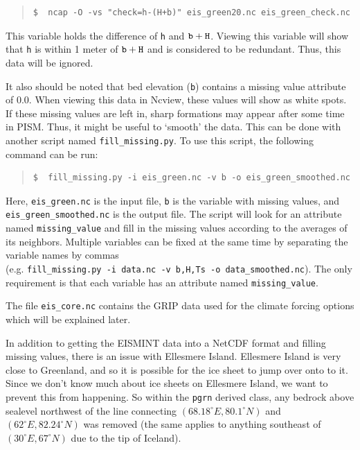 \documentclass[11pt,final]{amsart}
\begin{document}
\small\begin{quote}\begin{verbatim}
$  ncap -O -vs "check=h-(H+b)" eis_green20.nc eis_green_check.nc
\end{verbatim}
\end{quote}\normalsize

\noindent This variable holds the difference of \verb|h| and $\verb|b|+\verb|H|$.  Viewing this variable will show that \verb|h| is within 1 meter of $\verb|b|+\verb|H|$ and is considered to be redundant.  Thus, this data will be ignored.

It also should be noted that bed elevation (\verb|b|) contains a missing value attribute of $0.0$. When viewing this data in Ncview, these values will show as white spots. If these missing values are left in, sharp formations may appear after some time in PISM. Thus, it might be useful to `smooth' the data. This can be done with another script named \verb|fill_missing.py|. To use this script, the following command can be run:

\small\begin{quote}\begin{verbatim}
$  fill_missing.py -i eis_green.nc -v b -o eis_green_smoothed.nc
\end{verbatim}
\end{quote}\normalsize

\noindent Here, \verb|eis_green.nc| is the input file, \verb|b| is the variable with missing values, and \verb|eis_green_smoothed.nc| is the output file. The script will look for an attribute named \verb|missing_value| and fill in the missing values according to the averages of its neighbors. Multiple variables can be fixed at the same time by separating the variable names by commas \\
(e.g. \verb|fill_missing.py -i data.nc -v b,H,Ts -o data_smoothed.nc|). The only requirement is that each variable has an attribute named \verb|missing_value|.

The file \verb|eis_core.nc| contains the GRIP data used for the climate forcing options which will be explained later.

In addition to getting the EISMINT data into a NetCDF format and filling missing values, there is an issue with Ellesmere Island. Ellesmere Island is very close to Greenland, and so it is possible for the ice sheet to jump over onto to it. Since we don't know much about ice sheets on Ellesmere Island, we want to prevent this from happening. So within the \verb|pgrn| derived class, any bedrock above sealevel northwest of the line connecting $(68.18^\circ E, 80.1^\circ N)$ and $(62^\circ E, 82.24^\circ N)$ was removed (the same applies to anything southeast of $(30^\circ E, 67^\circ N)$ due to the tip of Iceland).
\end{document}
